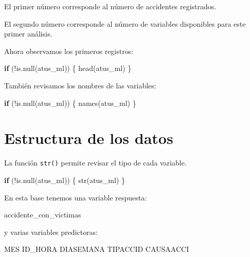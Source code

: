\documentclass[
  11pt,
  letterpaper,
]{book}
\newenvironment{Shaded}{\begin{snugshade}}{\end{snugshade}}
\newcommand{\ControlFlowTok}[1]{\textcolor[rgb]{0.00,0.23,0.31}{\textbf{#1}}}
\newcommand{\FunctionTok}[1]{\textcolor[rgb]{0.28,0.35,0.67}{#1}}
\newcommand{\NormalTok}[1]{\textcolor[rgb]{0.00,0.23,0.31}{#1}}
\newcommand{\SpecialCharTok}[1]{\textcolor[rgb]{0.37,0.37,0.37}{#1}}
\begin{document}
El primer número corresponde al número de accidentes registrados.

El segundo número corresponde al número de variables disponibles para
este primer análisis.

Ahora observamos los primeros registros:

\begin{Shaded}
\begin{Highlighting}[]
\ControlFlowTok{if}\NormalTok{ (}\SpecialCharTok{!}\FunctionTok{is.null}\NormalTok{(atus\_ml)) \{}
  \FunctionTok{head}\NormalTok{(atus\_ml)}
\NormalTok{\}}
\end{Highlighting}
\end{Shaded}

También revisamos los nombres de las variables:

\begin{Shaded}
\begin{Highlighting}[]
\ControlFlowTok{if}\NormalTok{ (}\SpecialCharTok{!}\FunctionTok{is.null}\NormalTok{(atus\_ml)) \{}
  \FunctionTok{names}\NormalTok{(atus\_ml)}
\NormalTok{\}}
\end{Highlighting}
\end{Shaded}

\section{Estructura de los datos}\label{estructura-de-los-datos}

La función \texttt{str()} permite revisar el tipo de cada variable.

\begin{Shaded}
\begin{Highlighting}[]
\ControlFlowTok{if}\NormalTok{ (}\SpecialCharTok{!}\FunctionTok{is.null}\NormalTok{(atus\_ml)) \{}
  \FunctionTok{str}\NormalTok{(atus\_ml)}
\NormalTok{\}}
\end{Highlighting}
\end{Shaded}

En esta base tenemos una variable respuesta:

\begin{Shaded}
\begin{Highlighting}[]
\NormalTok{accidente\_con\_victimas}
\end{Highlighting}
\end{Shaded}

y varias variables predictoras:

\begin{Shaded}
\begin{Highlighting}[]
\NormalTok{MES}
\NormalTok{ID\_HORA}
\NormalTok{DIASEMANA}
\NormalTok{TIPACCID}
\NormalTok{CAUSAACCI}
\end{Highlighting}
\end{Shaded}
\end{document}
